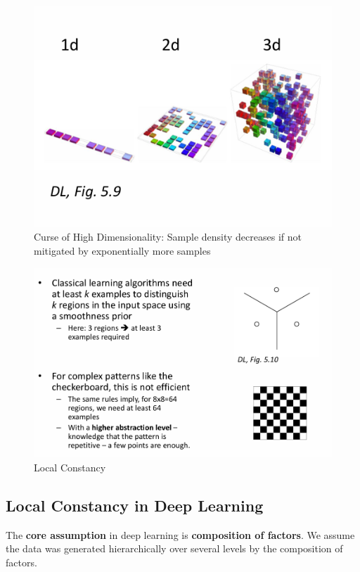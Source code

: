 \documentclass[../Main.tex]{subfiles}
\begin{document}
\begin{figure}[H]
    \centering
    \includegraphics[width=0.75\linewidth]{Images/curse-dimensionality.png}
    \caption{Curse of High Dimensionality: Sample density decreases if not mitigated by exponentially more samples}
\end{figure}


\begin{figure}[H]
    \centering
    \includegraphics[width=0.75\linewidth]{Images/local-constancy.png}
    \caption{Local Constancy}
\end{figure}

\subsection{Local Constancy in Deep Learning}
The \textbf{core assumption} in deep learning is \textbf{composition of factors}.
We assume the data was generated hierarchically over several levels by the composition of factors.
\end{document}

